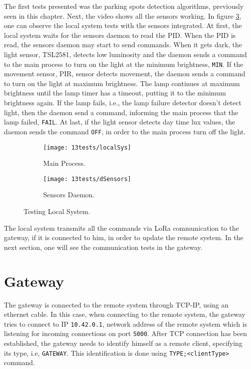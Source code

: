 The first tests presented was the parking spots detection algorithms, previously seen in this chapter. Next, the video shows all the sensors working. In figure \ref{fig:localSys}, one can observe the local system tests with the sensors integrated. At first, the local system waits for the sensors daemon to read the PID. When the PID is read, the sensors daemon may start to send commands. When it gets dark, the light sensor, TSL2581, detects low luminosity and the daemon sends a command to the main process to turn on the light at the minimum brightness, \verb|MIN|. If the movement sensor, PIR, sensor detects movement, the daemon sends a command to turn on the light at maximum brightness. The lamp continues at maximum brightness until the lamp timer has a timeout, putting it to the minimum brightness again. If the lamp fails, i.e., the lamp failure detector doesn't detect light, then the daemon send a command, informing the main process that the lamp failed, \verb|FAIL|. At last, if the light sensor detects day time lux values, the daemon sends the command \verb|OFF|, in order to the main process turn off the light. 

\begin{figure}[H]
	\centering
	\begin{subfigure}{.4\textwidth}
		\centering	
		\texttt{[image: 13tests/localSys]}
		\caption{Main Process.}
		\label{fig:main}
	\end{subfigure}%
	\begin{subfigure}{.4\textwidth}
		\centering
		\texttt{[image: 13tests/dSensors]}
		\caption{Sensors Daemon.}
		\label{fig:dSensors}
	\end{subfigure}
	\caption{Testing Local System.}
	\label{fig:localSys}
\end{figure}

The local system transmits all the commands via LoRa communication to the gateway, if it is connected to him, in order to update the remote system. In the next section, one will see the communication tests in the gateway.


\section{Gateway}
The gateway is connected to the remote system through TCP-IP, using an ethernet cable. In this case, when connecting to the remote system, the gateway tries to connect to IP \verb|10.42.0.1|, network address of the remote system which is listening for incoming connections on port \verb|5000|. After TCP connection has been established, the gateway needs to identify himself as a remote client, specifying its type, i.e, \verb|GATEWAY|. This identification is done using \verb|TYPE;<clientType>| command.

